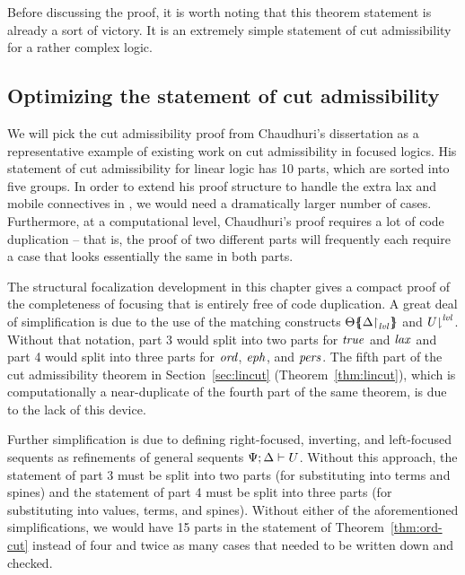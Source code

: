 Before discussing the proof, it is worth noting that this theorem
statement is already a sort of victory. It is an extremely simple
statement of cut admissibility for a rather complex logic.

\subsection{Optimizing the statement of cut admissibility}

We will pick the cut admissibility proof
from Chaudhuri's dissertation \cite{chaudhuri06focused} as a representative
example of existing work on cut admissibility in focused logics.  His
statement of cut admissibility for linear logic has 10 parts, 
which are sorted into
five groups. In order to extend his
proof structure to handle the extra lax and mobile connectives in
\ollll, we would need a dramatically larger number of
cases. Furthermore, at a computational level, Chaudhuri's proof
requires a lot of code duplication -- that is, the proof of two
different parts will frequently each require a case that looks essentially the
same in both parts.

The structural focalization development in this chapter gives a
compact proof of the completeness of focusing that is entirely free of
code duplication. 
A great deal of simplification is due to
the use of the matching constructs
${\Theta}\mbox{$\{\hspace{-4pt}\{$}{\ensuremath{{\Delta}{\upharpoonright}_{{\it lvl}}}}\mbox{$\}\hspace{-4pt}\}$}$ and
${U}{\downharpoonright}^{{\it lvl}}$. Without that notation, part 3 would split
into two parts for ${\it true}$ and ${\it lax}$ and part 4 would split into
three parts for ${\it ord}$, ${\it eph}$, and ${\it pers}$. The fifth part of the
cut admissibility theorem in Section~\ref{sec:lincut}
(Theorem~\ref{thm:lincut}), which is computationally a near-duplicate
of the fourth part of the same theorem, is due to the lack of this
device.

Further simplification is due to defining right-focused, inverting,
and left-focused sequents as refinements of general sequents
${\Psi};{\Delta} \vdash {U} \mathstrut$. Without this approach, the
statement of part 3 must be split into two parts (for substituting into
terms and spines) and the statement of part 4 must be split into 
three parts (for
substituting into values, terms, and spines). %
Without either of the aforementioned simplifications, we would have 15
parts in the statement of Theorem~\ref{thm:ord-cut} instead of four
and twice as many cases that needed to be
written down and checked.

